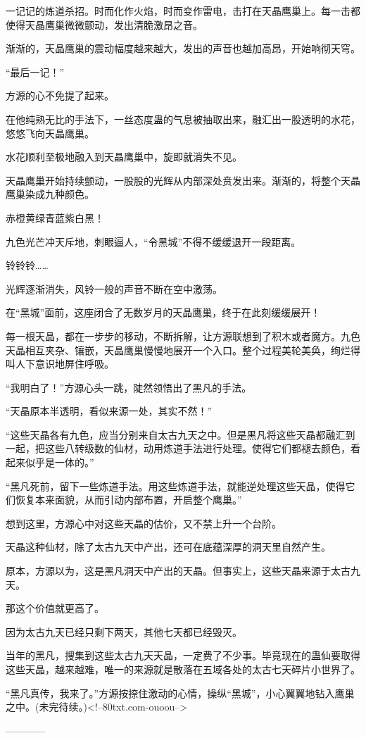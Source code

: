 \begin{this_body}
一记记的炼道杀招。时而化作火焰，时而变作雷电，击打在天晶鹰巢上。每一击都使得天晶鹰巢微微颤动，发出清脆激昂之音。

渐渐的，天晶鹰巢的震动幅度越来越大，发出的声音也越加高昂，开始响彻天穹。

“最后一记！”

方源的心不免提了起来。

在他纯熟无比的手法下，一丝态度蛊的气息被抽取出来，融汇出一股透明的水花，悠悠飞向天晶鹰巢。

水花顺利至极地融入到天晶鹰巢中，旋即就消失不见。

天晶鹰巢开始持续颤动，一股股的光辉从内部深处贲发出来。渐渐的，将整个天晶鹰巢染成九种颜色。

赤橙黄绿青蓝紫白黑！

九色光芒冲天斥地，刺眼逼人，“令黑城”不得不缓缓退开一段距离。

铃铃铃……

光辉逐渐消失，风铃一般的声音不断在空中激荡。

在“黑城”面前，这座闭合了无数岁月的天晶鹰巢，终于在此刻缓缓展开！

每一根天晶，都在一步步的移动，不断拆解，让方源联想到了积木或者魔方。九色天晶相互夹杂、镶嵌，天晶鹰巢慢慢地展开一个入口。整个过程美轮美奂，绚烂得叫人下意识地屏住呼吸。

“我明白了！”方源心头一跳，陡然领悟出了黑凡的手法。

“天晶原本半透明，看似来源一处，其实不然！”

“这些天晶各有九色，应当分别来自太古九天之中。但是黑凡将这些天晶都融汇到一起，把这些八转级数的仙材，动用炼道手法进行处理。使得它们都褪去颜色，看起来似乎是一体的。”

“黑凡死前，留下一些炼道手法。用这些炼道手法，就能逆处理这些天晶，使得它们恢复本来面貌，从而引动内部布置，开启整个鹰巢。”

想到这里，方源心中对这些天晶的估价，又不禁上升一个台阶。

天晶这种仙材，除了太古九天中产出，还可在底蕴深厚的洞天里自然产生。

原本，方源以为，这是黑凡洞天中产出的天晶。但事实上，这些天晶来源于太古九天。

那这个价值就更高了。

因为太古九天已经只剩下两天，其他七天都已经毁灭。

当年的黑凡，搜集到这些太古九天天晶，一定费了不少事。毕竟现在的蛊仙要取得这些天晶，越来越难，唯一的来源就是散落在五域各处的太古七天碎片小世界了。

“黑凡真传，我来了。”方源按捺住激动的心情，操纵“黑城”，小心翼翼地钻入鹰巢之中。(未完待续。)<!--80txt.com-ouoou-->

------------

\end{this_body}

